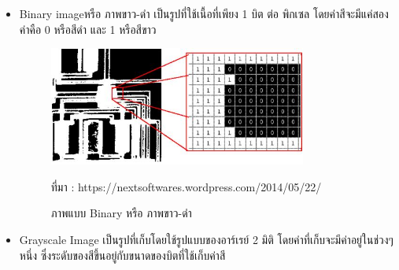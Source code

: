 		   \begin{itemize}
			   	\item   Binary imageหรือ ภาพขาว-ดำ เป็นรูปที่ใช้เนื้อที่เพียง 1 บิต ต่อ พิกเซล โดยค่าสีจะมีแค่สองค่าคือ 0 หรือสีดำ และ 1 หรือสีขาว
				 
					 \begin{figure}[H]
						\centering
						\includegraphics[width=0.8\textwidth]{Figures/2/2.jpg}
						\caption{ภาพแบบ Binary หรือ ภาพขาว-ดำ}{ที่มา : https://nextsoftwares.wordpress.com/2014/05/22/}
						\label{Fig:Studentloan1}
					\end{figure}

						\item  Grayscale Image เป็นรูปที่เก็บโดยใช้รูปแบบของอาร์เรย์ 2 มิติ โดยค่าที่เก็บจะมีค่าอยู่ในช่วงๆหนึ่ง ซึ่งระดับของสีขึ้นอยู่กับขนาดของบิตที่ใช้เก็บค่าสี


\end{itemize}

